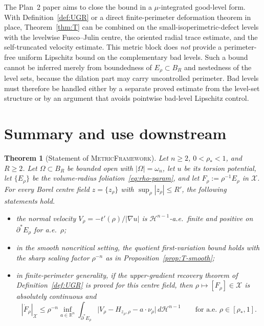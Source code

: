 \documentclass[11pt]{article}
\newtheorem{theorem}{Theorem}[section]
\theoremstyle{definition}
\newcommand{\R}{\mathbb{R}}
\newcommand{\Om}{\Omega}
\newcommand{\rstar}{\rho_{*}}
\newcommand{\X}{\mathcal X}
\begin{document}
The Plan~2 paper aims to close the bound in a $\mu$-integrated good-level
form.  With Definition~\ref{def:UGR} or a direct finite-perimeter deformation
theorem in place, Theorem~\ref{thm:T} can be combined on the
small-isoperimetric-defect levels with the levelwise Fusco--Julin centre, the
oriented radial trace estimate, and the self-truncated velocity estimate.
This metric block does \emph{not} provide a perimeter-free uniform Lipschitz
bound on the complementary bad levels.  Such a bound cannot be inferred merely
from boundedness of $E_\rho\subset B_R$ and nestedness of the level sets,
because the dilation part may carry uncontrolled perimeter.  Bad levels must
therefore be handled either by a separate proved estimate from the level-set
structure or by an argument that avoids pointwise bad-level Lipschitz control.

\section{Summary and use downstream}\label{sec:summary}

\begin{theorem}[Statement of \textsc{MetricFramework}]\label{thm:main}
Let $n\ge 2$, $0<\rstar<1$, and $R\ge 2$. Let $\Om\subset B_R$ be bounded
open with $|\Om|=\omega_n$, let $u$ be its torsion potential, let $\{E_\rho\}$
be the volume-radius foliation~\eqref{eq:rho-param}, and let
$F_\rho:=\rho^{-1}E_\rho$ in $\X$. For every Borel centre field $z=\{z_\rho\}$
with $\sup_\rho|z_\rho|\le R'$, the following statements hold.
\begin{itemize}
\item the normal velocity $V_\rho=-t'(\rho)/|\nabla u|$ is $\mathcal H^{n-1}$-a.e.\
finite and positive on $\partial^*E_\rho$ for a.e.\ $\rho$;
\item in the smooth noncritical setting, the quotient first-variation bound
holds with the sharp scaling factor $\rho^{-n}$ as in
Proposition~\ref{prop:T-smooth};
\item in finite-perimeter generality, if the upper-gradient recovery theorem
of Definition~\ref{def:UGR} is proved for this centre field, then
$\rho\mapsto[F_\rho]\in\X$ is absolutely continuous and
\[
   |\dot F_\rho|_\X\le \rho^{-n}\inf_{a\in\R^n}
   \int_{\partial^*E_\rho}\bigl|V_\rho-H_{z_\rho,\rho}-a\cdot\nu_\rho\bigr|
   \,d\mathcal H^{n-1}\qquad\text{for a.e.\ }\rho\in[\rstar,1].
\]
\end{itemize}
\end{theorem}
\end{document}

